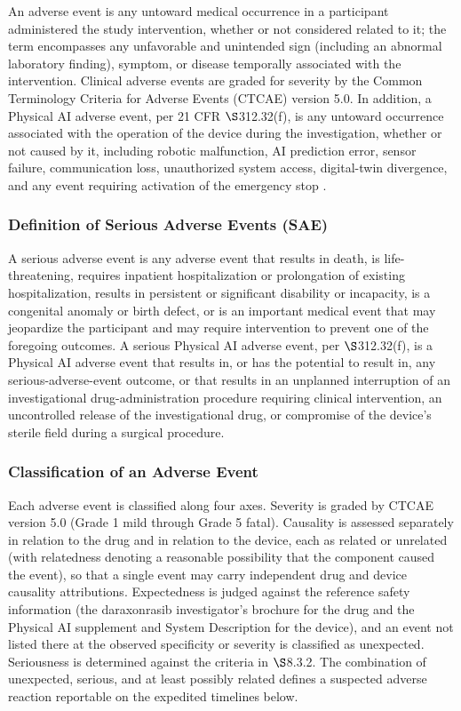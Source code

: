 An adverse event is any untoward medical occurrence in a participant administered the
study intervention, whether or not considered related to it; the term encompasses
any unfavorable and unintended sign (including an abnormal laboratory finding),
symptom, or disease temporally associated with the intervention. Clinical adverse
events are graded for severity by the Common Terminology Criteria for Adverse Events
(CTCAE) version 5.0. In addition, a Physical AI adverse event, per 21 CFR
$\S$312.32(f), is any untoward occurrence associated with the operation of the
device during the investigation, whether or not caused by it, including robotic
malfunction, AI prediction error, sensor failure, communication loss, unauthorized
system access, digital-twin divergence, and any event requiring activation of the
emergency stop \cite{kawchak2026adapt312}.

\subsubsection{Definition of Serious Adverse Events (SAE)}

A serious adverse event is any adverse event that results in death, is
life-threatening, requires inpatient hospitalization or prolongation of existing
hospitalization, results in persistent or significant disability or incapacity, is a
congenital anomaly or birth defect, or is an important medical event that may
jeopardize the participant and may require intervention to prevent one of the
foregoing outcomes. A serious Physical AI adverse event, per $\S$312.32(f), is a
Physical AI adverse event that results in, or has the potential to result in, any
serious-adverse-event outcome, or that results in an unplanned interruption of an
investigational drug-administration procedure requiring clinical intervention, an
uncontrolled release of the investigational drug, or compromise of the device's
sterile field during a surgical procedure.

\subsubsection{Classification of an Adverse Event}

Each adverse event is classified along four axes. Severity is graded by CTCAE
version 5.0 (Grade 1 mild through Grade 5 fatal). Causality is assessed separately
in relation to the drug and in relation to the device, each as related or unrelated
(with relatedness denoting a reasonable possibility that the component caused the
event), so that a single event may carry independent drug and device causality
attributions. Expectedness is judged against the reference safety information (the
daraxonrasib investigator's brochure for the drug and the Physical AI supplement
and System Description for the device), and an event not listed there at the
observed specificity or severity is classified as unexpected. Seriousness is
determined against the criteria in $\S$8.3.2. The combination of unexpected, serious,
and at least possibly related defines a suspected adverse reaction reportable on the
expedited timelines below.

